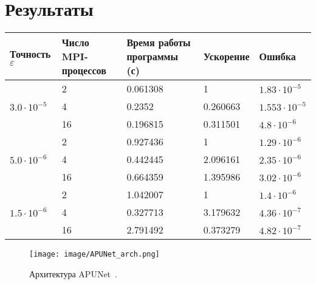 \documentclass[12pt]{article}
\begin{document}
\section{Результаты}

\begin{center}
	\begin{tabular}{|l|l|l|l|l|}
		\hline
		Точность $\varepsilon$ &
		Число MPI-процессов &
		Время работы программы (с) &
		Ускорение &
		Ошибка \\
		\hline
		& 2 & 0.061308 & 1 & $1.83 \cdot 10^{-5}$ \\
		\cline{2-5}
		$3.0 \cdot 10^{-5}$
		& 4 & 0.2352 & 0.260663 & $1.553 \cdot 10^{-5}$ \\
		\cline{2-5}
		& 16 & 0.196815 & 0.311501 & $4.8 \cdot 10^{-6}$ \\

		\hline
		& 2 & 0.927436 & 1 & $1.29 \cdot 10^{-6}$ \\
		\cline{2-5}
		$5.0 \cdot 10^{-6}$
		& 4 & 0.442445 & 2.096161 & $2.35 \cdot 10^{-6}$ \\
		\cline{2-5}
		& 16 & 0.664359 & 1.395986 & $3.02 \cdot 10^{-6}$ \\

		\hline
		& 2 & 1.042007 & 1 & $1.4 \cdot 10^{-6}$ \\
		\cline{2-5}
		$1.5 \cdot 10^{-6}$
		& 4 & 0.327713 & 3.179632 & $4.36 \cdot 10^{-7}$ \\
		\cline{2-5}
		& 16 & 2.791492 & 0.373279 & $4.82 \cdot 10^{-7}$ \\
		\hline
	\end{tabular}
\end{center}

\begin{figure}
	\centering

	\texttt{[image: image/APUNet\_arch.png]}

	\caption{Архитектура APUNet~\cite{bib:Go:APUNet}.}
	\label{float:overview:APUNetArch}
\end{figure}
\fi
\end{document}
